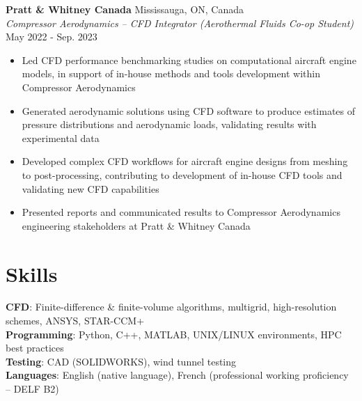 \documentclass[a4paper,11pt]{article}
\begin{document}
    \textbf{Pratt \& Whitney Canada}
    \hfill
    Mississauga, ON, Canada \\
    \textit{Compressor Aerodynamics -- CFD Integrator (Aerothermal Fluids Co-op Student)}
    \hfill
    May 2022 - Sep. 2023
    \begin{itemize}
        \itemsep0em
        \item Led CFD performance benchmarking studies on computational aircraft engine models, in support of in-house methods and tools development within Compressor Aerodynamics 
        \item Generated aerodynamic solutions using CFD software to produce estimates of pressure distributions and aerodynamic loads, validating results with experimental data 
        \item Developed complex CFD workflows for aircraft engine designs from meshing to post-processing, contributing to development of in-house CFD tools and validating new CFD capabilities
        \item Presented reports and communicated results to Compressor Aerodynamics engineering stakeholders at Pratt \& Whitney Canada
    \end{itemize}

\section{Skills}
    \textbf{CFD}: Finite-difference \& finite-volume algorithms, multigrid, high-resolution schemes, ANSYS, STAR-CCM+ \\
    \textbf{Programming}: Python, C++, MATLAB, UNIX/LINUX environments, HPC best practices \\
    \textbf{Testing}: CAD (SOLIDWORKS), wind tunnel testing \\
    \textbf{Languages}: English (native language), French (professional working proficiency -- DELF B2)

\end{document}
